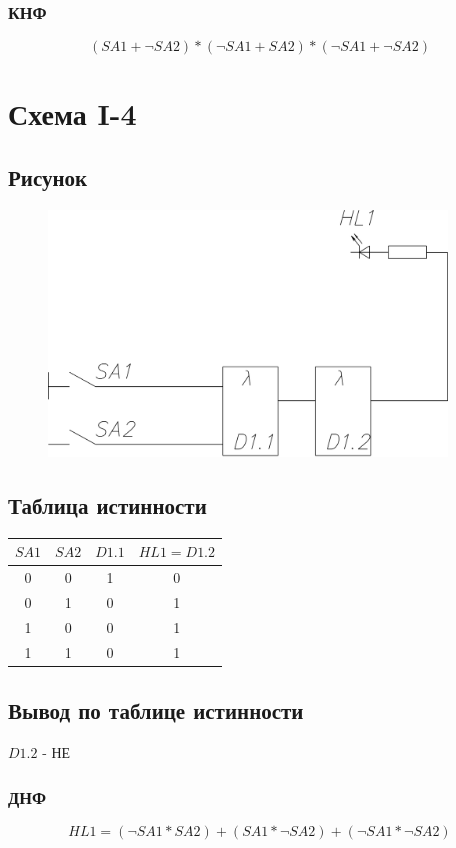 \documentclass[a4paper]{article}
\begin{document}
\subsubsection{КНФ}
$$ (SA1 + \neg SA2)*(\neg SA1 + SA2)*(\neg SA1 + \neg SA2)$$

\pagebreak

\section{Схема I-4}
\subsection{Рисунок}
\begin{figure}[H]
    \centering
    \includegraphics[width=300pt]{4.png}
\end{figure}
\subsection{Таблица истинности}
\begin{table}[H]
    \centering
    \begin{tabular}{|c|c|c|c|}
        \hline
        $SA1$ & $SA2$ & $D1.1$ & $HL1 = D1.2$\\
        \hline
        0 & 0 & 1 & 0 \\
        0 & 1 & 0 & 1 \\
        1 & 0 & 0 & 1 \\
        1 & 1 & 0 & 1 \\
        \hline
    \end{tabular}
\end{table}

\subsection{Вывод по таблице истинности}
$D1.2$ - НЕ
\subsubsection{ДНФ}
$$ HL1 = (\neg SA1 * SA2) + (SA1 * \neg SA2) + (\neg SA1 * \neg SA2)$$
\end{document}
